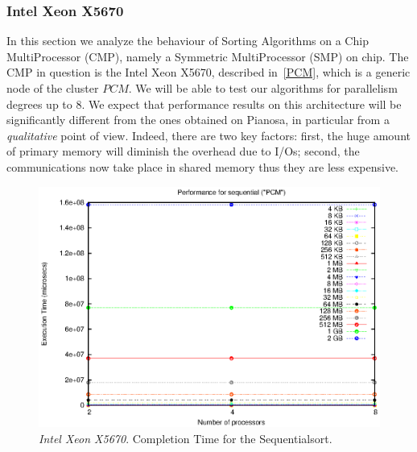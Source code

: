 \subsubsection{Intel Xeon X5670}
In this section we analyze the behaviour of Sorting Algorithms on a Chip MultiProcessor (CMP), namely a Symmetric MultiProcessor (SMP) on chip. The CMP in question is the Intel Xeon X5670, described in~\ref{PCM}, which is a generic node of the cluster $PCM$. We will be able to test our algorithms for parallelism degrees up to 8. We expect that performance results on this architecture will be significantly different from the ones obtained on Pianosa, in particular from a \textit{qualitative} point of view. Indeed, there are two key factors: first, the huge amount of primary memory will diminish the overhead due to I/Os; second, the communications now take place in shared memory thus they are less expensive.

\begin{figure}[t]
	\begin{center}
		\includegraphics[scale=0.6]{plots/test_00_PCM/NxTxM/sequential_PCM_NxTxM}
	\end{center}
  	\caption{\textit{Intel Xeon X5670}. Completion Time for the Sequentialsort.}
  	\label{sequential-PCM}
\end{figure}

